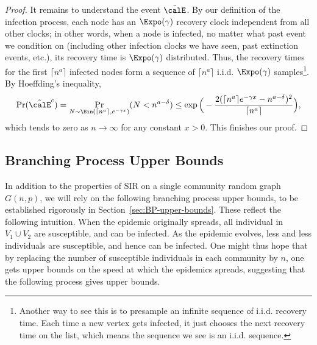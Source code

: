 \documentclass[11pt]{article}
\begin{document}
\begin{proof}
    It remains to understand the event $\tilde\calE$. By our definition of the infection process, each node has an $\Expo(\gamma)$ recovery clock independent from all other clocks; in other words, when a node is infected, no matter what past event we condition on (including other infection clocks we have seen, past extinction events, etc.), its recovery time is $\Expo(\gamma)$ distributed. Thus, the recovery times for the first $\lceil n^a \rceil$ infected nodes form a sequence of $\lceil n^a \rceil$ i.i.d. $\Expo(\gamma)$ samples\footnote{Another way to see this is to presample an infinite sequence of i.i.d. recovery time.  Each time a new vertex gets infected, it just chooses the next recovery time on the list, which means the sequence we see is an i.i.d. sequence.}. By Hoeffding's inequality, 
    \[
    \Pr(\tilde\calE^c) = \Pr_{N\sim\Bin(\lceil n^a \rceil, e^{-\gamma x})}(N < n^{a-\delta}) \le \exp\Big(-\frac{2 (\lceil n^a \rceil e^{-\gamma x} - n^{a-\delta})^2}{\lceil n^a \rceil}\Big),
    \]
    which tends to zero as $n\to \infty$ for any constant $x > 0$. This finishes our proof.
\end{proof}

\subsection{Branching Process Upper Bounds}\label{sec:BP-results-summary}
In addition to the properties of SIR on a single community random graph $G(n,p)$, we will rely on the following branching process upper bounds, to be established rigorously in Section~\ref{sec:BP-upper-bounds}.
These reflect the following intuition.  When the epidemic originally spreads,  all individual in $V_1\cup V_2$ are susceptible, and can be infected.  As the epidemic evolves, less and less individuals are susceptible, and hence can be infected.  One might thus hope that by replacing the number of susceptible individuals in each community by $n$, one gets upper bounds on the speed at which the epidemics spreads, suggesting that the following process gives upper bounds.
\end{document}
